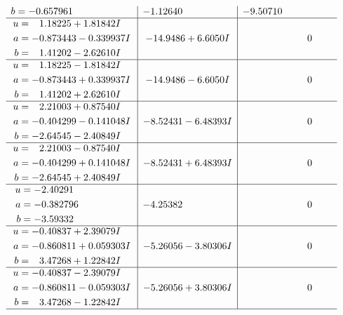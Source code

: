 \documentclass[1p]{elsarticle_modified}
\theoremstyle{definition}
\begin{document}
$$\begin{array}{c|c|c}
\begin{aligned}
b &= -0.657961\phantom{ +0.000000I}\end{aligned}
 & -1.12640\phantom{ +0.000000I} & -9.50710\phantom{ +0.000000I} \\ \hline\begin{aligned}
u &= \phantom{-}1.18225 + 1.81842 I \\
a &= -0.873443 - 0.339937 I \\
b &= \phantom{-}1.41202 - 2.62610 I\end{aligned}
 & -14.9486 + 6.6050 I & \phantom{-0.000000 } 0 \\ \hline\begin{aligned}
u &= \phantom{-}1.18225 - 1.81842 I \\
a &= -0.873443 + 0.339937 I \\
b &= \phantom{-}1.41202 + 2.62610 I\end{aligned}
 & -14.9486 - 6.6050 I & \phantom{-0.000000 } 0 \\ \hline\begin{aligned}
u &= \phantom{-}2.21003 + 0.87540 I \\
a &= -0.404299 - 0.141048 I \\
b &= -2.64545 - 2.40849 I\end{aligned}
 & -8.52431 - 6.48393 I & \phantom{-0.000000 } 0 \\ \hline\begin{aligned}
u &= \phantom{-}2.21003 - 0.87540 I \\
a &= -0.404299 + 0.141048 I \\
b &= -2.64545 + 2.40849 I\end{aligned}
 & -8.52431 + 6.48393 I & \phantom{-0.000000 } 0 \\ \hline\begin{aligned}
u &= -2.40291\phantom{ +0.000000I} \\
a &= -0.382796\phantom{ +0.000000I} \\
b &= -3.59332\phantom{ +0.000000I}\end{aligned}
 & -4.25382\phantom{ +0.000000I} & \phantom{-0.000000 } 0 \\ \hline\begin{aligned}
u &= -0.40837 + 2.39079 I \\
a &= -0.860811 + 0.059303 I \\
b &= \phantom{-}3.47268 + 1.22842 I\end{aligned}
 & -5.26056 - 3.80306 I & \phantom{-0.000000 } 0 \\ \hline\begin{aligned}
u &= -0.40837 - 2.39079 I \\
a &= -0.860811 - 0.059303 I \\
b &= \phantom{-}3.47268 - 1.22842 I\end{aligned}
 & -5.26056 + 3.80306 I & \phantom{-0.000000 } 0\\
 \hline 
 \end{array}$$\newpage\newpage\renewcommand{\arraystretch}{1}
\end{document}
